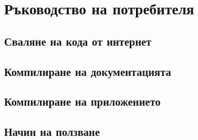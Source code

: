 \chapter{Ръководство на потребителя}
  \section{Сваляне на кода от интернет}

  \section{Компилиране на документацията}

  \section{Компилиране на приложението}

  \section{Начин на ползване}
